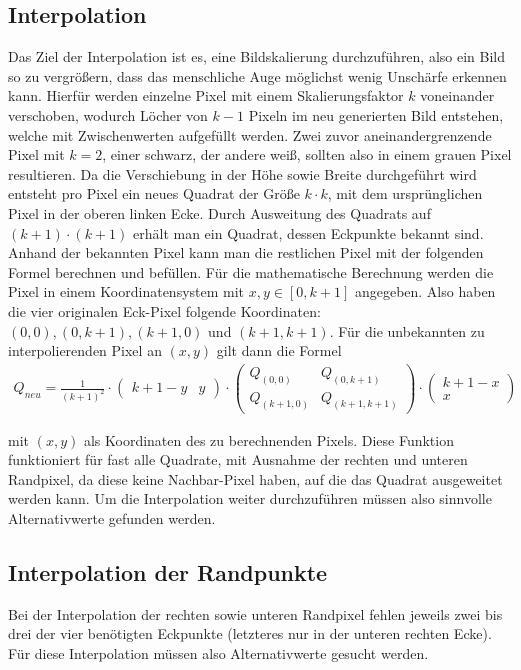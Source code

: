 \documentclass[course=erap]{aspdoc}
\begin{document}
\subsection{Interpolation}
Das Ziel der Interpolation ist es, eine Bildskalierung durchzuführen, also ein Bild so zu vergrößern, dass das menschliche Auge möglichst wenig Unschärfe erkennen kann. Hierfür werden einzelne Pixel mit einem Skalierungsfaktor $k$ voneinander verschoben, wodurch Löcher von $k-1$ Pixeln im neu generierten Bild entstehen, welche mit Zwischenwerten aufgefüllt werden. Zwei zuvor aneinandergrenzende Pixel mit $k = 2$, einer schwarz, der andere weiß, sollten also in einem grauen Pixel resultieren. Da die Verschiebung in der Höhe sowie Breite durchgeführt wird entsteht pro Pixel ein neues Quadrat der Größe $k \cdot k$, mit dem ursprünglichen Pixel in der oberen linken Ecke. Durch Ausweitung des Quadrats auf $(k+1) \cdot (k+1)$ erhält man
ein Quadrat, dessen Eckpunkte bekannt sind. Anhand der bekannten Pixel kann man die restlichen Pixel mit der folgenden Formel berechnen und befüllen. Für die mathematische Berechnung werden die Pixel in einem Koordinatensystem mit $x, y \in [0, k+1]$ angegeben. Also haben die vier originalen Eck-Pixel folgende Koordinaten: $(0, 0), (0, k+1), (k+1, 0)$ und $(k+1, k+1)$. Für die unbekannten zu interpolierenden Pixel an $(x, y)$ gilt dann die Formel
 \begin{align}
    Q_{neu} {=}  \frac{1}{(k+1)^2} \cdot
    \begin{pmatrix} k+1-y & y \end{pmatrix} \cdot
    \begin{pmatrix} Q_{(0,0)} & Q_{(0,k+1)} \\ Q_{(k+1,0)} & Q_{(k+1,k+1)} \end{pmatrix}
    \cdot
     \begin{pmatrix} k+1-x \\ x \end{pmatrix} 
\end{align}

 
mit $(x, y)$ als Koordinaten des zu berechnenden Pixels. Diese Funktion funktioniert für fast alle Quadrate, mit Ausnahme der rechten und unteren Randpixel, da diese keine Nachbar-Pixel haben, auf die das Quadrat ausgeweitet werden kann. Um die Interpolation weiter durchzuführen müssen also sinnvolle Alternativwerte gefunden werden.

\subsection{Interpolation der Randpunkte}
Bei der Interpolation der rechten sowie unteren Randpixel fehlen jeweils zwei bis drei der vier benötigten Eckpunkte (letzteres nur in der unteren rechten Ecke). Für diese Interpolation müssen also Alternativwerte gesucht werden.
\end{document}
